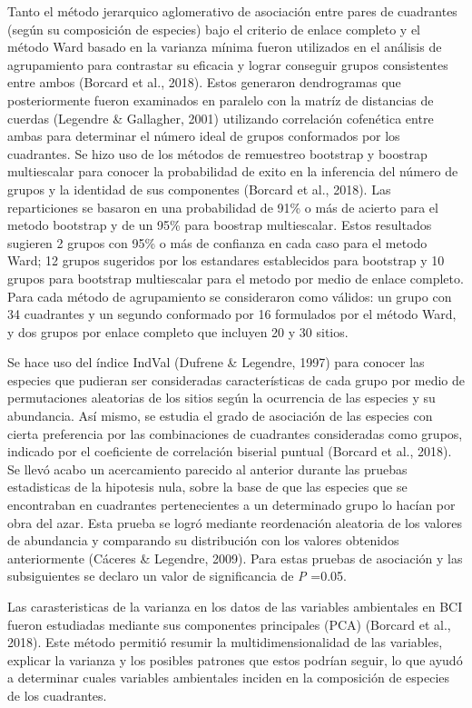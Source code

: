\documentclass[11pt,]{article}
\begin{document}
Tanto el método jerarquico aglomerativo de asociación entre pares de
cuadrantes (según su composición de especies) bajo el criterio de enlace
completo y el método Ward basado en la varianza mínima fueron utilizados
en el análisis de agrupamiento para contrastar su eficacia y lograr
conseguir grupos consistentes entre ambos (Borcard et al., 2018). Estos
generaron dendrogramas que posteriormente fueron examinados en paralelo
con la matríz de distancias de cuerdas (Legendre \& Gallagher, 2001)
utilizando correlación cofenética entre ambas para determinar el número
ideal de grupos conformados por los cuadrantes. Se hizo uso de los
métodos de remuestreo bootstrap y boostrap multiescalar para conocer la
probabilidad de exito en la inferencia del número de grupos y la
identidad de sus componentes (Borcard et al., 2018). Las reparticiones
se basaron en una probabilidad de 91\% o más de acierto para el metodo
bootstrap y de un 95\% para boostrap multiescalar. Estos resultados
sugieren 2 grupos con 95\% o más de confianza en cada caso para el
metodo Ward; 12 grupos sugeridos por los estandares establecidos para
bootstrap y 10 grupos para bootstrap multiescalar para el metodo por
medio de enlace completo. Para cada método de agrupamiento se
consideraron como válidos: un grupo con 34 cuadrantes y un segundo
conformado por 16 formulados por el método Ward, y dos grupos por enlace
completo que incluyen 20 y 30 sitios.

Se hace uso del índice IndVal (Dufrene \& Legendre, 1997) para conocer
las especies que pudieran ser consideradas características de cada grupo
por medio de permutaciones aleatorias de los sitios según la ocurrencia
de las especies y su abundancia. Así mismo, se estudia el grado de
asociación de las especies con cierta preferencia por las combinaciones
de cuadrantes consideradas como grupos, indicado por el coeficiente de
correlación biserial puntual (Borcard et al., 2018). Se llevó acabo un
acercamiento parecido al anterior durante las pruebas estadisticas de la
hipotesis nula, sobre la base de que las especies que se encontraban en
cuadrantes pertenecientes a un determinado grupo lo hacían por obra del
azar. Esta prueba se logró mediante reordenación aleatoria de los
valores de abundancia y comparando su distribución con los valores
obtenidos anteriormente (Cáceres \& Legendre, 2009). Para estas pruebas
de asociación y las subsiguientes se declaro un valor de significancia
de \emph{P} =0.05.

Las carasteristicas de la varianza en los datos de las variables
ambientales en BCI fueron estudiadas mediante sus componentes
principales (PCA) (Borcard et al., 2018). Este método permitió resumir
la multidimensionalidad de las variables, explicar la varianza y los
posibles patrones que estos podrían seguir, lo que ayudó a determinar
cuales variables ambientales inciden en la composición de especies de
los cuadrantes.
\end{document}
